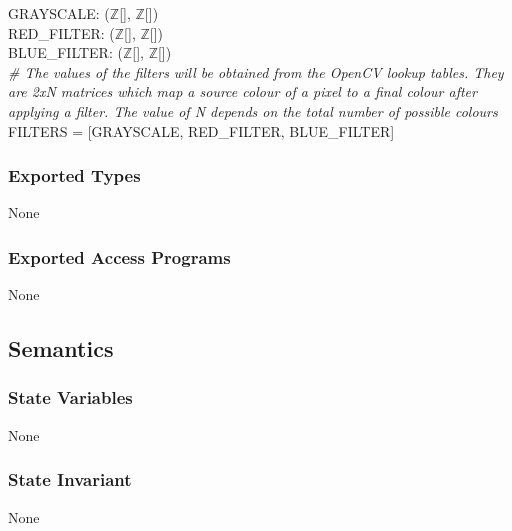 \documentclass[12pt, titlepage]{article}
\begin{document}
GRAYSCALE: ($\mathbb{Z}$[], $\mathbb{Z}$[])\\
RED\_FILTER: ($\mathbb{Z}$[], $\mathbb{Z}$[]) \\
BLUE\_FILTER: ($\mathbb{Z}$[], $\mathbb{Z}$[])\\
\textit{\# The values of the filters will be obtained from the OpenCV lookup tables. They are 2xN matrices which map a source colour of a pixel to a final colour after applying a filter. The value of N depends on the total number of possible colours}\\
FILTERS = [GRAYSCALE, RED\_FILTER, BLUE\_FILTER]\\

\subsubsection* {Exported Types}

None

\subsubsection* {Exported Access Programs}

None

\subsection* {Semantics}

\subsubsection* {State Variables}

None

\subsubsection* {State Invariant}

None

\newpage
\end{document}
